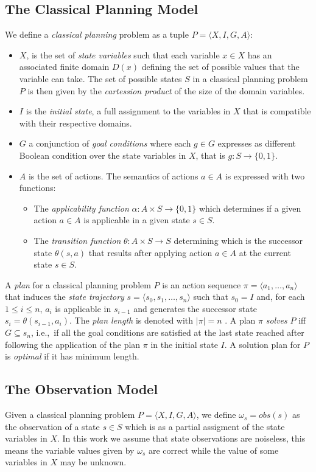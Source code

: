\documentclass[letterpaper]{article} %
\newcommand{\tup}[1]{{\langle #1 \rangle}}
\begin{document}
\subsection{The Classical Planning Model}
We define a {\em classical planning} problem as a tuple $P=\tup{X,I,G,A}$:
\begin{itemize}
\item $X$, is the set of {\em state variables} such that each variable $x\in X$ has an associated finite domain $D(x)$ defining the set of possible values that the variable can take. The set of possible states $S$ in a classical planning problem $P$ is then given by the {\em cartession product} of the size of the domain variables.
\item $I$ is the {\em initial state}, a full assignment to the variables in $X$ that is compatible with their respective domains.
\item $G$ a conjunction of {\em goal conditions} where each $g\in G$ expresses as different Boolean condition over the state variables in $X$, that is $g:S\rightarrow \{0,1\}$.
\item $A$ is the set of actions. The semantics of actions $a\in A$ is expressed with two functions:
\begin{itemize}
\item The {\em applicability function} $\alpha:A\times S\rightarrow \{0,1\}$ which determines if a given action $a\in A$ is applicable in a given state $s\in S$.
\item The {\em transition function} $\theta:A\times S\rightarrow S$ determining which is the successor state $\theta(s,a)$ that results after applying action $a\in A$ at the current state $s\in S$.
\end{itemize}
\end{itemize}

A {\em plan} for a classical planning problem $P$ is an action sequence $\pi=\tup{a_1, \ldots, a_n}$ that induces the {\em state trajectory} $s=\tup{s_0, s_1, \ldots, s_n}$ such that $s_0=I$ and, for each {\small $1\leq i\leq n$}, $a_i$ is applicable in $s_{i-1}$ and generates the successor state $s_i=\theta(s_{i-1},a_i)$. The {\em plan length} is denoted with $|\pi|=n$ . A plan $\pi$ {\em solves} $P$ iff $G\subseteq s_n$, i.e.,~if all the goal conditions are satisfied at the last state reached after following the application of the plan $\pi$ in the initial state $I$. A solution plan for $P$ is {\em optimal} if it has minimum length.

\subsection{The Observation Model}
Given a classical planning problem $P=\tup{X,I,G,A}$, we define $\omega_s=obs(s)$ as the observation of a state $s\in S$ which is as a partial assigment of the state variables in $X$. In this work we assume that state observations are noiseless, this means the variable values given by $\omega_s$ are correct while the value of some variables in $X$ may be unknown.
\end{document}
